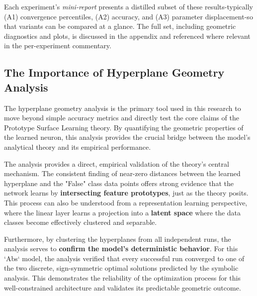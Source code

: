 Each experiment's \emph{mini-report} presents a distilled subset of these
results-typically (A1) convergence percentiles, (A2) accuracy, and (A3)
parameter displacement-so that variants can be compared at a glance.  The full
set, including geometric diagnostics and plots, is discussed in the appendix
and referenced where relevant in the per-experiment commentary.

\subsection*{The Importance of Hyperplane Geometry Analysis}
\label{sec:analysis-importance-abs1}

The hyperplane geometry analysis is the primary tool used in this research to move beyond simple accuracy metrics and directly test the core claims of the Prototype Surface Learning theory. By quantifying the geometric properties of the learned neuron, this analysis provides the crucial bridge between the model's analytical theory and its empirical performance.

The analysis provides a direct, empirical validation of the theory's central mechanism. The consistent finding of near-zero distances between the learned hyperplane and the "False" class data points offers strong evidence that the network learns by \textbf{intersecting feature prototypes}, just as the theory posits. This process can also be understood from a representation learning perspective, where the linear layer learns a projection into a \textbf{latent space} where the data classes become effectively clustered and separable.

Furthermore, by clustering the hyperplanes from all independent runs, the analysis serves to \textbf{confirm the model's deterministic behavior}. For this `Abs` model, the analysis verified that every successful run converged to one of the two discrete, sign-symmetric optimal solutions predicted by the symbolic analysis. This demonstrates the reliability of the optimization process for this well-constrained architecture and validates its predictable geometric outcome.